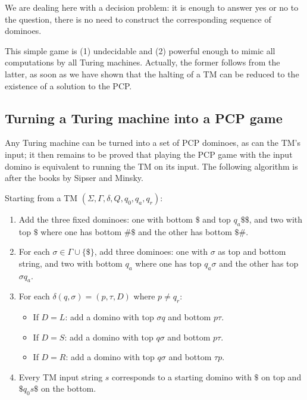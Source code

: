 We are dealing here with a decision problem: it is enough to answer
yes or no to the question, there is no need to construct the
corresponding sequence of dominoes.

This simple game is (1) undecidable and (2) powerful enough to mimic all
computations by all Turing machines. Actually, the former follows from
the latter, as soon as we have shown that the halting of a TM can be
reduced to the existence of a solution to the PCP.

\subsection{Turning a Turing machine into a PCP game}
Any Turing machine can be turned into a set of PCP dominoes, as can the TM's input; it then remains to be proved that playing the PCP game with the input domino is equivalent to running the TM on its input. The following algorithm is after the books by Sipser and Minsky.

\begin{code}
Starting from a TM $(\Sigma,\Gamma,\delta,Q,q_0,q_a,q_r)$:
\begin{enumerate}
\item Add the three fixed dominoes: one with bottom $\$$ and top $q_a \$\$$, and two with top $\$$ where one has bottom $\#\$$ and the other has bottom $\$\#$.

\item For each $\sigma\in \Gamma \cup \{\$\}$, add three dominoes: one with $\sigma$ as top and bottom string, and two with bottom $q_a$ where one has top $q_a \sigma$ and the other has top $\sigma q_a$.

\item For each $\delta(q,\sigma) = (p,\tau,D)$ where $p\neq q_r$:
\begin{itemize}
	\item If $D=L$: add a domino with top $\sigma q$ and bottom $p\tau$.   %
	\item If $D=S$: add a domino with top $q \sigma$ and bottom $p\tau$.
	\item If $D=R$: add a domino with top $q \sigma$ and bottom $\tau p$.
\end{itemize}

\item Every TM input string $s$ corresponds to a starting domino with $\$$ on top and $\$q_0 s\$$ on the bottom.
\end{enumerate}
\end{code}

